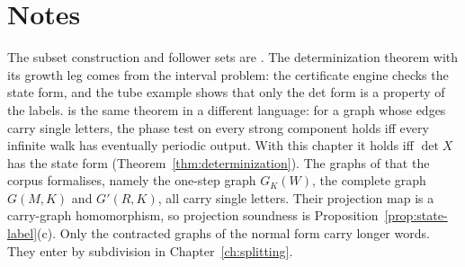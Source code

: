 \section*{Notes}
The subset construction and follower sets are \cite[§§3.2--3.3]{LM95}. The determinization
theorem with its growth leg comes from the interval problem: the certificate engine checks the
state form, and the tube example shows that only the det form is a property of the labels.
\cite[Thm.~21]{Oda26} is the same theorem in a different language: for a graph whose edges
carry single letters, the phase test on every strong component holds iff every infinite walk
has eventually periodic output. With this chapter it holds iff \(\det X\) has the state form
(Theorem~\ref{thm:determinization}). The graphs of \cite{Oda26} that the corpus formalises,
namely the one-step graph \(G_K(W)\), the complete graph \(G(M,K)\) and \(G'(R,K)\), all carry
single letters. Their projection map \cite[Lemma~31]{Oda26} is a carry-graph homomorphism, so
projection soundness is Proposition~\ref{prop:state-label}(c). Only the contracted graphs of
the normal form carry longer words. They enter by subdivision in
Chapter~\ref{ch:splitting}.

